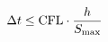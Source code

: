 \documentclass[preview]{standalone}
\begin{document}
\begin{align*}
\special{dvisvgm:raw <g id='unique000'>}\Delta t \leq \text{CFL} \cdot \frac{h}{S_{\max}}\special{dvisvgm:raw </g>}
\end{align*}
\end{document}
